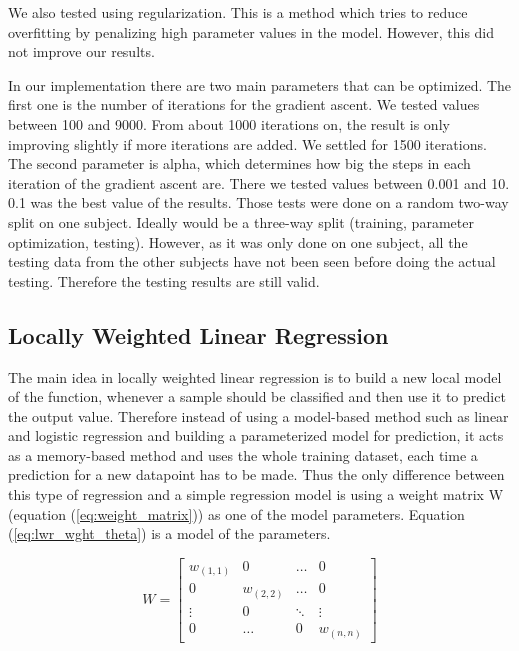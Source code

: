 \documentclass[12pt, a4paper, onecolumn, oneside, parskip=half]{scrartcl}
\begin{document}
We also tested using regularization. This is a method which tries to reduce overfitting by penalizing high parameter values in the model. However, this did not improve our results.

In our implementation there are two main parameters that can be optimized. The first one is the number of iterations for the gradient ascent. We tested values between 100 and 9000. From about 1000 iterations on, the result is only improving slightly if more iterations are added. We settled for 1500 iterations. The second parameter is alpha, which determines how big the steps in each iteration of the gradient ascent are. There we tested values between 0.001 and 10. 0.1 was the best value of the results. Those tests were done on a random two-way split on one subject. Ideally would be a three-way split (training, parameter optimization, testing). However, as it was only done on one subject, all the testing data from the other subjects have not been seen before doing the actual testing. Therefore the testing results are still valid.


\subsection{Locally Weighted Linear Regression}

The main idea in locally weighted linear regression is to build a new local model of the function, whenever a sample should be classified and then use it to predict the output value. Therefore instead of using a model-based method such as linear and logistic regression and building a parameterized model for prediction, it acts as a memory-based method and uses the whole training dataset, each time a prediction for a new datapoint has to be made. Thus the only difference between this type of regression and a simple regression model is using a weight matrix W (equation (\ref{eq:weight_matrix})) as one of the model parameters. Equation (\ref{eq:lwr_wght_theta}) is a model of the parameters.

\begin{equation}
\label{eq:weight_matrix}
W = \begin{bmatrix}
w_{(1,1)}	& 0	& \dots	 & 0      \\
0	& w_{(2,2)} 	& \dots  & 0 	  \\
\vdots	& 0 	& \ddots & \vdots \\
0 	& \dots & 0	 & w_{(n,n)}
\end{bmatrix}
\end{equation}
\end{document}
